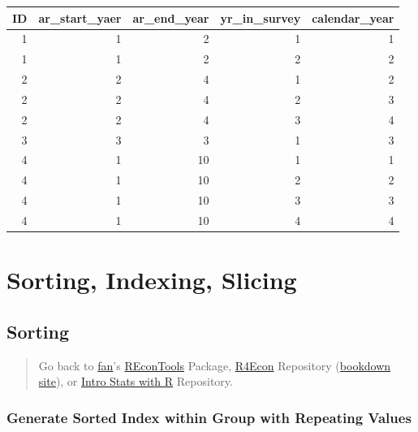 \documentclass[
]{book}
\begin{document}
\begin{table}[!h]
\centering
\begin{tabular}{r|r|r|r|r}
\hline
ID & ar\_start\_yaer & ar\_end\_year & yr\_in\_survey & calendar\_year\\
\hline
\rowcolor{gray!6}  1 & 1 & 2 & 1 & 1\\
\hline
1 & 1 & 2 & 2 & 2\\
\hline
\rowcolor{gray!6}  2 & 2 & 4 & 1 & 2\\
\hline
2 & 2 & 4 & 2 & 3\\
\hline
\rowcolor{gray!6}  2 & 2 & 4 & 3 & 4\\
\hline
3 & 3 & 3 & 1 & 3\\
\hline
\rowcolor{gray!6}  4 & 1 & 10 & 1 & 1\\
\hline
4 & 1 & 10 & 2 & 2\\
\hline
\rowcolor{gray!6}  4 & 1 & 10 & 3 & 3\\
\hline
4 & 1 & 10 & 4 & 4\\
\hline
\end{tabular}
\end{table}

\hypertarget{sorting-indexing-slicing}{%
\section{Sorting, Indexing, Slicing}\label{sorting-indexing-slicing}}

\hypertarget{sorting}{%
\subsection{Sorting}\label{sorting}}

\begin{quote}
Go back to \href{http://fanwangecon.github.io/}{fan}'s \href{https://fanwangecon.github.io/REconTools/}{REconTools} Package, \href{https://fanwangecon.github.io/R4Econ/}{R4Econ} Repository (\href{https://fanwangecon.github.io/R4Econ/bookdown}{bookdown site}), or \href{https://fanwangecon.github.io/Stat4Econ/}{Intro Stats with R} Repository.
\end{quote}

\hypertarget{generate-sorted-index-within-group-with-repeating-values}{%
\subsubsection{Generate Sorted Index within Group with Repeating Values}\label{generate-sorted-index-within-group-with-repeating-values}}
\end{document}
